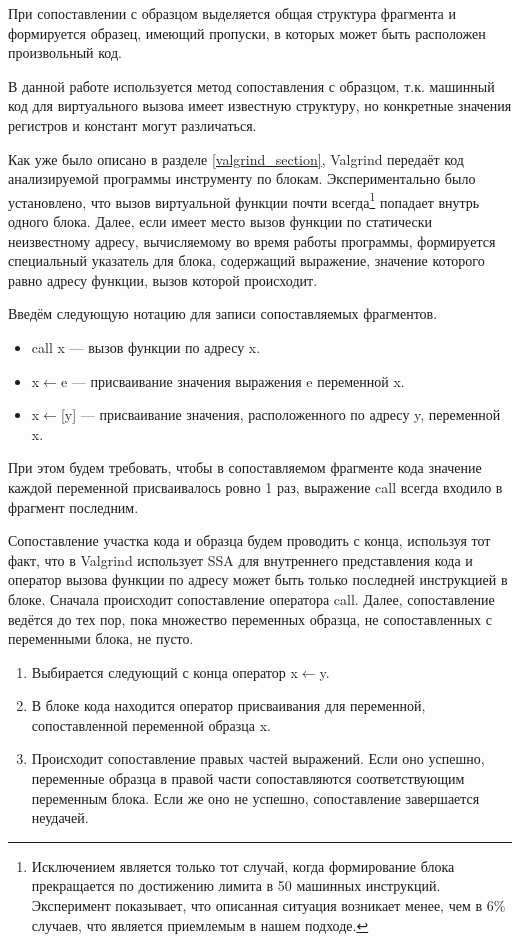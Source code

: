 \documentclass[a4paper,12pt,russian]{article}
\newcommand{\code}[1]{\textsf{#1}}
\begin{document}
При сопоставлении с образцом выделяется общая структура фрагмента и формируется образец, имеющий пропуски, в которых может быть расположен произвольный код.

В данной работе используется метод сопоставления с образцом, т.к. машинный код для виртуального вызова имеет известную структуру, но конкретные значения регистров и констант могут различаться.

Как уже было описано в разделе \ref{valgrind_section}, \code{Valgrind} передаёт код анализируемой программы инструменту по блокам. Экспериментально было установлено, что вызов виртуальной функции почти всегда\footnote{Исключением является только тот случай, когда формирование блока прекращается по достижению лимита в 50 машинных инструкций. Эксперимент показывает, что описанная ситуация возникает менее, чем в 6\% случаев, что является приемлемым в нашем подходе.} попадает внутрь одного блока.
Далее, если имеет место вызов функции по статически неизвестному адресу, вычисляемому во время работы программы, формируется специальный указатель для блока, содержащий выражение, значение которого равно адресу функции, вызов которой происходит.

Введём следующую нотацию для записи сопоставляемых фрагментов.
\begin{itemize}
    \item \code{call x} --- вызов функции по адресу \code{x}.
    \item \code{x}$\leftarrow$\code{e} --- присваивание значения выражения \code{e} переменной \code{x}.
    \item \code{x}$\leftarrow$\code{[y]} --- присваивание значения, расположенного по адресу \code{y}, переменной \code{x}.
\end{itemize}
При этом будем требовать, чтобы в сопоставляемом фрагменте кода значение каждой переменной присваивалось ровно 1 раз, выражение \code{call} всегда входило в фрагмент последним.

Сопоставление участка кода и образца будем проводить с конца, используя тот факт, что в \code{Valgrind} использует \code{SSA} для внутреннего представления кода и оператор вызова функции по адресу может быть только последней инструкцией в блоке.
Сначала происходит сопоставление оператора \code{call}. Далее, сопоставление ведётся до тех пор, пока множество переменных образца, не сопоставленных с переменными блока, не пусто.

\begin{enumerate}
    \item Выбирается следующий с конца оператор \code{x}$\leftarrow$\code{y}.
    \item В блоке кода находится оператор присваивания для переменной, сопоставленной переменной образца \code{x}.
    \item Происходит сопоставление правых частей выражений. Если оно успешно, переменные образца в правой части сопоставляются соответствующим переменным блока. Если же оно не успешно, сопоставление завершается неудачей.
\end{enumerate}
\end{document}
